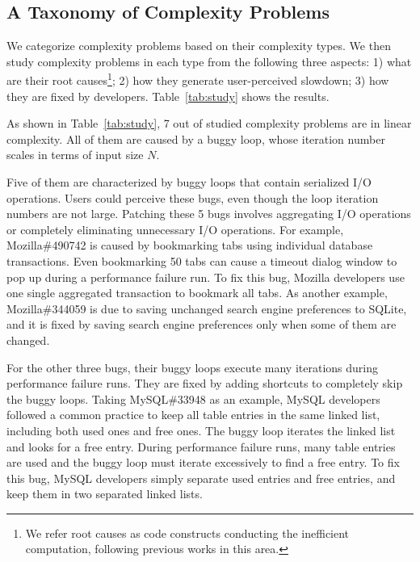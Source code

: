 \subsection{A Taxonomy of Complexity Problems}
\label{sec:tax}



We categorize complexity problems based on their complexity types.
We then study complexity problems in each type from the following three aspects:
1) what are their root causes\footnote{We refer root causes as code constructs 
conducting the inefficient computation, 
following previous works in this area\cite{SongOOPSLA2014,ldoctor}.};
2) how they generate user-perceived slowdown;
3) how they are fixed by developers. 
Table~\ref{tab:study} shows the results. 

As shown in Table~\ref{tab:study}, 
7 out of \ComBugs studied complexity problems are in linear complexity. 
All of them are caused by a buggy loop, 
whose iteration number scales in terms of input size $N$.

Five of them are characterized by buggy loops that contain serialized I/O operations.
Users could perceive these bugs, 
even though the loop iteration numbers are not large.
Patching these 5 bugs involves aggregating I/O operations 
or completely eliminating unnecessary I/O operations. 
For example, Mozilla\#490742 is caused by bookmarking 
tabs using individual database transactions. 
Even bookmarking 50 tabs can cause a timeout dialog 
window to pop up during a performance failure run. 
To fix this bug, Mozilla developers use one single aggregated transaction 
to bookmark all tabs.
As another example, Mozilla\#344059 is due to saving unchanged 
search engine preferences to SQLite, 
and it is fixed by saving search 
engine preferences
only when some of them are changed.

For the other three bugs,
their buggy loops execute many iterations during performance failure runs.
They are fixed by adding shortcuts to completely skip the buggy loops. 
Taking MySQL\#33948 as an example,
MySQL developers followed a common practice to keep all table entries in the same linked list, 
including both used ones and free ones. 
The buggy loop iterates the linked list and looks for a free entry.
During performance failure runs, 
many table entries are used and the buggy loop must iterate excessively to find a free entry.
To fix this bug, MySQL developers simply separate used entries and free entries,
and keep them in two separated linked lists. 


